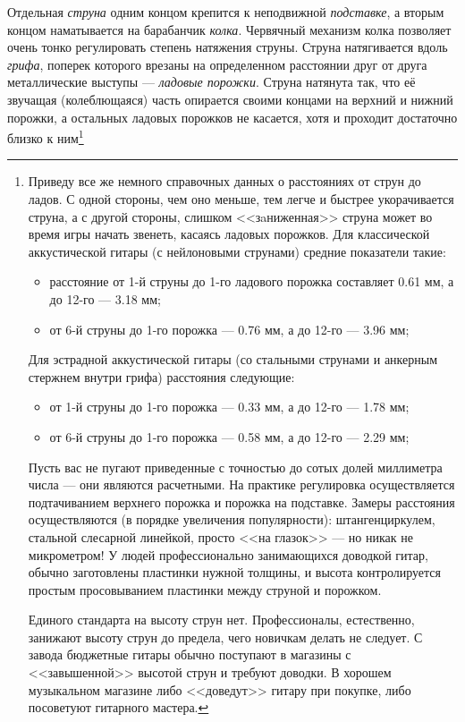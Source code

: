Отдельная \emph{струна} одним концом крепится к неподвижной \emph{подставке}, а вторым концом наматывается на барабанчик \emph{колка}. Червячный механизм колка позволяет очень тонко регулировать степень натяжения струны. Струна натягивается вдоль \emph{грифа}, поперек которого врезаны на определенном расстоянии друг от друга металлические выступы --- \emph{ладовые порожки}. Струна натянута так, что её звучащая (колеблющаяся) часть опирается своими концами на верхний и нижний порожки, а остальных ладовых порожков не касается, хотя и проходит достаточно близко к ним\footnote{
    Приведу все же немного справочных данных о расстояниях от струн до ладов. С одной стороны, чем оно меньше, тем легче и быстрее укорачивается струна, а с другой стороны, слишком <<зaниженная>> струна может во время игры начать звенеть, касаясь ладовых порожков. Для классической аккустической гитары (с нейлоновыми струнами) средние показатели такие: 
    \begin{itemize}
        \item расстояние от 1-й струны до 1-го ладового порожка составляет 0.61 мм, а до 12-го --- 3.18 мм;
        \item от 6-й струны до 1-го порожка --- 0.76 мм, а до 12-го --- 3.96 мм;
    \end{itemize}
    
    Для эстрадной аккустической гитары (со стальными струнами и анкерным стержнем внутри грифа) расстояния следующие:
    \begin{itemize}
        \item от 1-й струны до 1-го порожка --- 0.33 мм, а до 12-го --- 1.78 мм;
        \item от 6-й струны до 1-го порожка --- 0.58 мм, а до 12-го --- 2.29 мм;
    \end{itemize}
    
    Пусть вас не пугают приведенные с точностью до сотых долей миллиметра числа --- они являются расчетными. На практике регулировка осуществляется подтачиванием верхнего порожка и порожка на подставке. Замеры расстояния осуществляются (в порядке увеличения популярности): штангенциркулем, стальной слесарной линейкой, просто <<на глазок>> --- но никак не микрометром! У людей профессионально занимающихся доводкой гитар, обычно заготовлены пластинки нужной толщины, и высота контролируется простым просовыванием пластинки между струной и порожком.
    
    Единого стандарта на высоту струн нет. Профессионалы, естественно, занижают высоту струн до предела, чего новичкам делать не следует. С завода бюджетные гитары обычно поступают в магазины с <<завышенной>> высотой струн и требуют доводки. В хорошем музыкальном магазине либо <<доведут>> гитару при покупке, либо посоветуют гитарного мастера.
}

